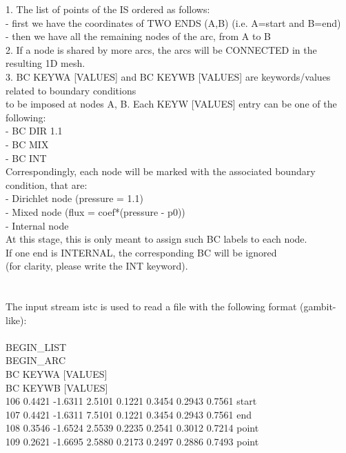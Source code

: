 \documentclass[a4paper]{report}
\newcommand\tab[1][1cm]{\hspace*{#1}}
\begin{document}
{  1. The list of points of the IS ordered as follows:\\
\tab     - first we have the coordinates of TWO ENDS (A,B) (i.e. A=start and B=end)\\
\tab     - then we have all the remaining nodes of the arc, from A to B\\
  2. If a node is shared by more arcs, the arcs will be CONNECTED in the resulting 1D mesh.\\
  3. BC KEYWA [VALUES] and BC KEYWB [VALUES] are keywords/values related to boundary conditions\\
     to be imposed at nodes A, B. Each KEYW [VALUES] entry can be one of the following: \\
\tab     - BC DIR 1.1\\
\tab     - BC MIX \\
\tab     - BC INT \\
     Correspondingly, each node will be marked with the associated boundary condition, that are:\\
\tab     - Dirichlet node (pressure = 1.1)\\
\tab     - Mixed     node (flux = coef*(pressure - p0))\\
\tab     - Internal  node\\
     At this stage, this is only meant to assign such BC labels to each node.\\
     If one end is INTERNAL, the corresponding BC will be ignored \\
     (for clarity, please write the INT keyword).     \\
\\
\\
     The input stream istc is used to read a file with the following format (gambit-like): \\
\\
\tab		BEGIN\_\-LIST\\
\tab		BEGIN\_\-ARC \\
\tab		BC KEYWA [VALUES] \\
\tab		BC KEYWB [VALUES]\\
\tab		 106       0.4421      -1.6311       2.5101		0.1221		0.3454		0.2943		0.7561 start\\
\tab		 107       0.4421      -1.6311       7.5101		0.1221		0.3454		0.2943		0.7561 end  \\
\tab		 108       0.3546      -1.6524       2.5539		0.2235		0.2541		0.3012		0.7214 point\\
\tab		 109       0.2621      -1.6695       2.5880		0.2173		0.2497		0.2886		0.7493 point\\
}
\end{document}
